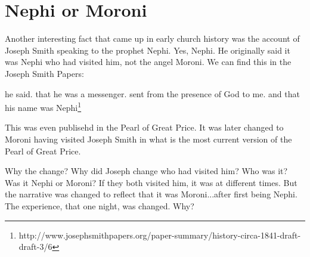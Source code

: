 \section{Nephi or Moroni}

Another interesting fact that came up in early church history was the account of
Joseph Smith speaking to the prophet Nephi. Yes, Nephi. He originally said it
was Nephi who had visited him, not the angel Moroni. We can find this in the
Joseph Smith Papers:

\begin{displayquote}
he said. that he was a messenger. sent from the 
presence of God to me. and that his name was Nephi\footnote{
http://www.josephsmithpapers.org/paper-summary/history-circa-1841-draft-draft-3/6
}
\end{displayquote}

This was even publisehd in the Pearl of Great Price. It was later changed to
Moroni having visited Joseph Smith in what is the most current version of the
Pearl of Great Price.

Why the change? Why did Joseph change who had visited him? Who was it? Was it
Nephi or Moroni? If they both visited him, it was at different times. But the
narrative was changed to reflect that it was Moroni...after first being Nephi.
The experience, that one night, was changed. Why?